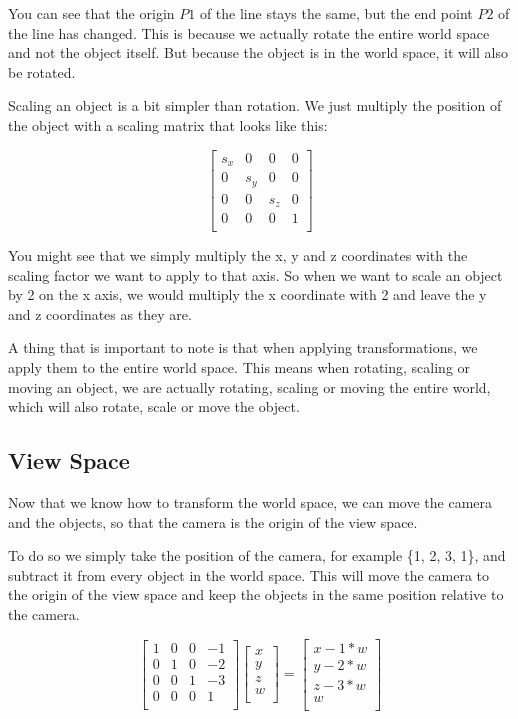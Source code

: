 \documentclass[12pt]{report} \usepackage{preamble}
\begin{document}
You can see that the origin \(P1\) of the line stays the same, but the end point \(P2\)
of the line has changed. This is because we actually rotate the entire
world space and not the object itself. But because the object is in the
world space, it will also be rotated.

Scaling an object is a bit simpler than rotation. We just multiply
the position of the object with a scaling matrix that
looks like this:

\[
	\begin{bmatrix}
		s_x & 0   & 0   & 0 \\
		0   & s_y & 0   & 0 \\
		0   & 0   & s_z & 0 \\
		0   & 0   & 0   & 1 \\
	\end{bmatrix}
\]

You might see that we simply multiply the x, y and z coordinates with the
scaling factor we want to apply to that axis. So when we want to scale an
object by 2 on the x axis, we would multiply the x coordinate with 2 and
leave the y and z coordinates as they are.

A thing that is important to note is that when applying transformations,
we apply them to the entire world space. This means when rotating, scaling or
moving an object, we are actually rotating, scaling or moving the entire world,
which will also rotate, scale or move the object.

\subsection{View Space}

Now that we know how to transform the world space, we can move the camera
and the objects, so that the camera is the origin of the view space.

To do so we simply take the position of the camera, for example \{1, 2, 3, 1\},
and subtract it from every object in the world space. This will move the
camera to the origin of the view space and keep the objects in the same
position relative to the camera.

\[
	\begin{bmatrix}
		1 & 0 & 0 & -1 \\
		0 & 1 & 0 & -2 \\
		0 & 0 & 1 & -3 \\
		0 & 0 & 0 & 1  \\
	\end{bmatrix}
	\begin{bmatrix}
		x \\
		y \\
		z \\
		w \\
	\end{bmatrix}
	=
	\begin{bmatrix}
		x - 1*w \\
		y - 2*w \\
		z - 3*w \\
		w       \\
	\end{bmatrix}
\]
\end{document}
